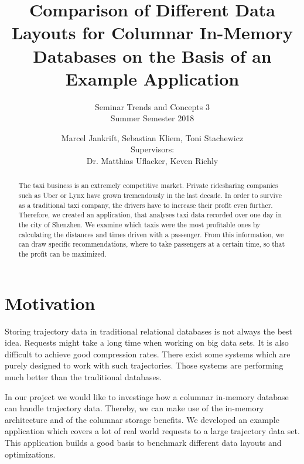 \documentclass[10pt]{sig-alternate}
\begin{document}

\title{
  \vspace{24pt}
  Comparison of Different Data Layouts for Columnar In-Memory Databases on the Basis of an Example Application
}
\subtitle{
  Seminar Trends and Concepts 3\\
  Summer Semester 2018
}


\author{
  Marcel Jankrift, Sebastian Kliem, Toni Stachewicz\\[12pt]
  Supervisors:\\
  Dr. Matthias Uflacker, Keven Richly
}


\maketitle
\begin{abstract}
The taxi business is an extremely competitive market. Private ridesharing companies such as Uber or Lynx have grown tremendously in the last decade. In order to survive as a traditional taxi company, the drivers have to increase their profit even further. Therefore, we created an application, that analyses taxi data recorded over one day in the city of Shenzhen. We examine which taxis were the most profitable ones by calculating the distances and times driven with a passenger. From this information, we can draw specific recommendations, where to take passengers at a certain time, so that the profit can be maximized.
\end{abstract}


\section{Motivation}

Storing trajectory data in traditional relational databases is not always the best idea. Requests might take a long time when working on big data sets. It is also difficult to achieve good compression rates. There exist some systems which are purely designed to work with such trajectories. Those systems are performing much better than the traditional databases.

In our project we would like to investiage how a columnar in-memory database can handle trajectory data. Thereby, we can make use of the in-memory architecture and of the columnar storage benefits. We developed an example application which covers a lot of real world requests to a large trajectory data set. This application builds a good basis to benchmark different data layouts and optimizations.
\end{document}

